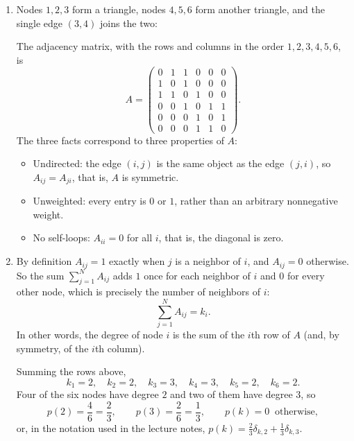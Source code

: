 \documentclass[a4paper,12pt]{article}
\begin{document}
\begin{enumerate}[label=(\alph*)]
\item Nodes $1,2,3$ form a triangle, nodes $4,5,6$ form another triangle, and the single edge $(3,4)$ joins the two:
\begin{center}
\end{center}
The adjacency matrix, with the rows and columns in the order $1,2,3,4,5,6$, is
\[ A = \begin{pmatrix}
0 & 1 & 1 & 0 & 0 & 0\\
1 & 0 & 1 & 0 & 0 & 0\\
1 & 1 & 0 & 1 & 0 & 0\\
0 & 0 & 1 & 0 & 1 & 1\\
0 & 0 & 0 & 1 & 0 & 1\\
0 & 0 & 0 & 1 & 1 & 0
\end{pmatrix} . \]
The three facts correspond to three properties of $A$:
\begin{itemize}
\item Undirected: the edge $(i,j)$ is the same object as the edge $(j,i)$, so $A_{ij}=A_{ji}$, that is, $A$ is symmetric.
\item Unweighted: every entry is $0$ or $1$, rather than an arbitrary nonnegative weight.
\item No self-loops: $A_{ii}=0$ for all $i$, that is, the diagonal is zero.
\end{itemize}

\item By definition $A_{ij}=1$ exactly when $j$ is a neighbor of $i$, and $A_{ij}=0$ otherwise. So the sum $\sum_{j=1}^{N} A_{ij}$ adds $1$ once for each neighbor of $i$ and $0$ for every other node, which is precisely the number of neighbors of $i$:
\[ \sum_{j=1}^{N} A_{ij} = k_i . \]
In other words, the degree of node $i$ is the sum of the $i$th row of $A$ (and, by symmetry, of the $i$th column).

Summing the rows above,
\[ k_1=2, \quad k_2=2, \quad k_3=3, \quad k_4=3, \quad k_5=2, \quad k_6=2 . \]
Four of the six nodes have degree $2$ and two of them have degree $3$, so
\[ p(2)=\frac{4}{6}=\frac{2}{3}, \qquad p(3)=\frac{2}{6}=\frac{1}{3}, \qquad p(k)=0 \ \text{ otherwise} , \]
or, in the notation used in the lecture notes, $p(k) = \frac{2}{3}\delta_{k,2}+\frac{1}{3}\delta_{k,3}$.


\end{enumerate}
\end{document}
